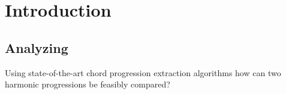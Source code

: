 \chapter{Introduction}

\section{Analyzing}

Using state-of-the-art chord progression extraction algorithms how can two harmonic progressions be feasibly compared?
